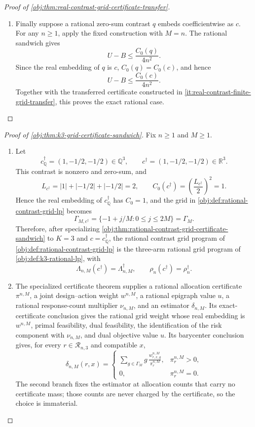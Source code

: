 \documentclass[11pt]{article}
\begin{document}
\begin{proof}[Proof of \cref{obj:thm:real-contrast-grid-certificate-transfer}]
\begin{enumerate}
\item Finally suppose a rational zero-sum contrast \(q\) embeds coefficientwise as \(c\).  For any \(n\ge1\), apply the fixed construction with \(M=n\).  The rational sandwich gives
\[
U-B\le \frac{C_0(q)}{4n^2}.
\]
Since the real embedding of \(q\) is \(c\), \(C_0(q)=C_0(c)\), and hence
\[
U-B\le \frac{C_0(c)}{4n^2}.
\]
Together with the transferred certificate constructed in \cref{it:real-contrast-finite-grid-transfer}, this proves the exact rational case. %
\end{enumerate}
\end{proof}

\begin{proof}[Proof of \cref{obj:thm:k3-grid-certificate-sandwich}]
Fix \(n\geq 1\) and \(M\geq 1\).
\begin{enumerate}
\item Let
\[
c_{\mathbb Q}^\dagger=(1,-1/2,-1/2)\in\mathbb Q^3,
\qquad
c^\dagger=(1,-1/2,-1/2)\in\mathbb R^3 .
\]
This contrast is nonzero and zero-sum, and
\[
L_{c^\dagger}=|1|+|-1/2|+|-1/2|=2,
\qquad
C_0(c^\dagger)=\left(\frac{L_{c^\dagger}}2\right)^2=1 .
\]
Hence the real embedding of \(c_{\mathbb Q}^\dagger\) has \(C_0=1\), and the grid in \cref{obj:def:rational-contrast-grid-lp} becomes
\[
\Gamma_{M,c^\dagger}
=
\{-1+j/M:0\leq j\leq 2M\}
=
\Gamma_M .
\]
Therefore, after specializing \cref{obj:thm:rational-contrast-grid-certificate-sandwich} to \(K=3\) and \(c=c_{\mathbb Q}^\dagger\), the rational contrast grid program of \cref{obj:def:rational-contrast-grid-lp} is the three-arm rational grid program of \cref{obj:def:k3-rational-lp}, with
\[
\Lambda_{n,M}(c^\dagger)=\Lambda_{n,M}^\dagger,
\qquad
\rho_n(c^\dagger)=\rho_n^\dagger .
\]

\item The specialized certificate theorem supplies a rational allocation certificate \(\pi^{n,M}\), a joint design--action weight \(w^{n,M}\), a rational epigraph value \(u\), a rational response-count multiplier \(\nu_{n,M}\), and an estimator \(\delta_{n,M}\). Its exact-certificate conclusion gives the rational grid weight whose real embedding is \(w^{n,M}\), primal feasibility, dual feasibility, the identification of the risk component with \(\nu_{n,M}\), and dual objective value \(u\). Its barycenter conclusion gives, for every \(r\in\mathcal R_{n,3}\) and compatible \(x\),
\[
\delta_{n,M}(r,x)
=
\begin{cases}
\displaystyle
\sum_{g\in\Gamma_M}g\,\frac{w_{r,x,g}^{n,M}}{\pi_r^{n,M}},
& \pi_r^{n,M}>0,\\[1ex]
0,& \pi_r^{n,M}=0.
\end{cases}
\]
The second branch fixes the estimator at allocation counts that carry no certificate mass; those counts are never charged by the certificate, so the choice is immaterial.


\end{enumerate}
\end{proof}
\end{document}
